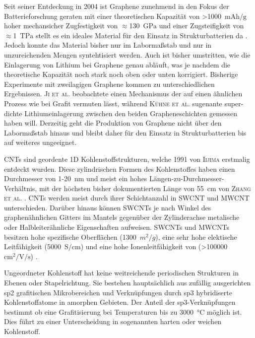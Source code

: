 Seit seiner Entdeckung in 2004 \cite{Novoselov2004} ist Graphene zunehmend in den Fokus der Batterieforschung geraten mit einer theoretischen Kapazität von >1000~$\si{\mA \hour \per \g}$ hoher mechansicher Zugfestigkeit von $\approx$130~$\si{\GPa}$ und einer Zugsteifigkeit von $\approx$1~$\si{\tera \Pa}$ stellt es ein ideales Material für den Einsatz in Strukturbatterien da \cite{Novoselov2012}. Jedoch konnte das Material bisher nur im Labormaßstab und nur in unzureichenden Mengen syntehtisiert werden. Auch ist bisher umstritten, wie die Einlagerung von Lithium bei Graphene genau abläuft, was je nachdem die theoretische Kapazität noch stark noch oben oder unten korrigiert. Bisherige Experimente mit zweilagigen Graphene kommen zu unterschiedlichen Ergebnissen. \textsc{Ji et al.} beobachtete einen Mechanismus der auf einen ähnlichen Prozess wie bei Grafit vermuten lässt, während \textsc{Kühne et al.} sugenante super-dichte Lithiumeinlagerung zwischen den beiden Grapheneschichten gemessen haben will. Derzeitig geht die Produktion von Graphene nicht über den Labormaßstab hinaus und bleibt daher für den Einsatz in Strukturbatterien bis auf weiteres ungeeignet.

CNTs sind geordente 1D Kohlenstoffstrukturen, welche 1991 von \textsc{Iijima} \cite{Iijima1991} erstmalig entdeckt wurden. Diese zylindrischen Formen des Kohlenstoffes haben einen Durchmesser von 1-20~$\si{\nano\metre}$  und meist ein hohes Längen-zu-Durchmesser-Verhältnis, mit der höchsten bisher dokumentierten Länge von 55~$\si{\centi\metre}$ von \textsc{Zhang et al.} \cite{Zhang2013}. CNTs werden meist durch ihrer Schichtanzahl in SWCNT und MWCNT unterschieden. Darüber hinaus können SWCNTs je nach Winkel des graphenähnlichen Gitters im Mantels gegenüber der Zylinderachse metalische oder Halbleiterähnliche Eigenschaften aufweisen. 
SWCNTs und MWCNTs besitzen hohe spezifische Oberflächen (1300~$m^2/g$), eine sehr hohe elektische Leitfähigkeit (5000~$\si{\siemens \per \cm}$) und eine hohe Ionenleitfähigkeit von (>100000~$\si{\cm \squared \per \V \per \s}$) \cite{Xu2011,Uetani2014,Charlier2007}.

Ungeordneter Kohlenstoff hat keine weitreichende periodischen Strukturen in Ebenen oder Stapelrichtung. Sie bestehen hauptsächlich aus zufällig ausgerichten sp2 grafitischen Mikrobereichen und Verknüpfungen durch sp3 hybridiserte Kohlenstoffatome in amorphen Gebieten. Der Anteil der sp3-Verknüpfungen bestimmt ob eine Grafitisierung bei Temperaturen bis zu 3000~$\si{\degreeCelsius}$ möglich ist. Dies führt zu einer Unterscheidung in sogenannten harten oder weichen Kohlenstoff. 

